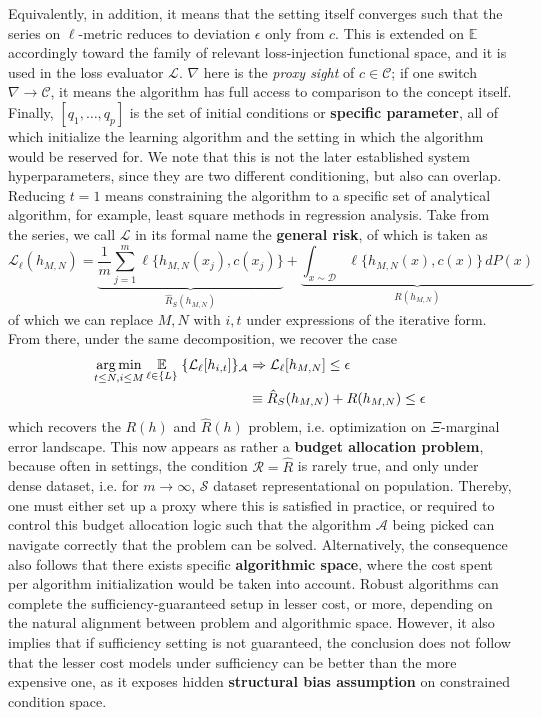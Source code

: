 Equivalently, in addition, it means that the setting itself converges such that the series on $\ell$-metric reduces to deviation $\epsilon$ only from $c$. This is extended on $\mathbb{E}$ accordingly toward the family of relevant loss-injection functional space, and it is used in the loss evaluator $\mathcal{L}$. $\nabla$ here is the \textit{proxy sight} of $c\in\mathcal{C}$; if one switch $\nabla\to \mathcal{C}$, it means the algorithm has full access to comparison to the concept itself. Finally, $[q_{1},\dots,q_{p}] $ is the set of initial conditions or \textbf{specific parameter}, all of which initialize the learning algorithm and the setting in which the algorithm would be reserved for. We note that this is not the later established system hyperparameters, since they are two different conditioning, but also can overlap. Reducing $t=1$ means constraining the algorithm to a specific set of analytical algorithm, for example, least square methods in regression analysis. Take from the series, we call $\mathcal{L}$ in its formal name the \textbf{general risk}, of which is taken as
\begin{equation}
    \mathcal{L}_{\ell}(h_{M,N}) = \underbrace{\frac{1}{m}\sum_{j=1}^m \ell\{h_{M,N}(x_j), c(x_j)\}}_{\hat{R}_S(h_{M,N})} + \underbrace{\int_{x\sim\mathcal{D}} \ell\{h_{M,N}(x), c(x)\}\,dP(x)}_{R(h_{M,N})}
\end{equation}
of which we can replace $M,N$ with $i,t$ under expressions of the iterative form. From there, under the same decomposition, we recover the case
\begin{equation}
    \begin{split}
       \operatorname*{arg\,min}_{t\leq N, i \leq M} \underset{\ell\in\{L\}}{\mathbb{E}}\; \{ \mathcal{L}_{\ell}[h_{i,t}] \}_{\mathcal{A}} &\Rightarrow \mathcal{L}_{\ell}[h_{M,N}]\leq \epsilon\\
        & \equiv \hat{R}_S(h_{M,N}) + R(h_{M,N}) \leq \epsilon
    \end{split}
\end{equation}
which recovers the $R(h)$ and $\hat{R}(h)$ problem, i.e. optimization on $\Xi$-marginal error landscape. This now appears as rather a \textbf{budget allocation problem}, because often in settings, the condition $\mathcal{R}= \hat{R}$ is rarely true, and only under dense dataset, i.e. for $m\to\infty$, $\mathcal{S}$ dataset representational on population. Thereby, one must either set up a proxy where this is satisfied in practice, or required to control this budget allocation logic such that the algorithm $\mathcal{A}$ being picked can navigate correctly that the problem can be solved. Alternatively, the consequence also follows that there exists specific \textbf{algorithmic space}, where the cost spent per algorithm initialization would be taken into account. Robust algorithms can complete the sufficiency-guaranteed setup in lesser cost, or more, depending on the natural alignment between problem and algorithmic space. However, it also implies that if sufficiency setting is not guaranteed, the conclusion does not follow that the lesser cost models under sufficiency can be better than the more expensive one, as it exposes hidden \textbf{structural bias assumption} on constrained condition space.  

